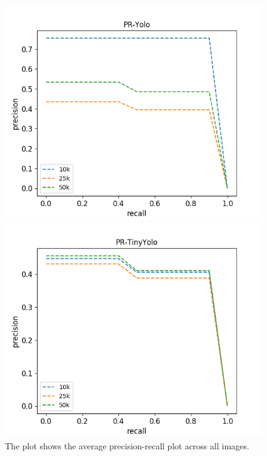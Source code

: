 \documentclass{article}
\begin{document}
\begin{figure}[h]
	\centering
	\begin{minipage}{0.45\textwidth}
		\centering
	\includegraphics[width=\textwidth]{fig/pr_yolo}
	\end{minipage}
	\begin{minipage}{0.45\textwidth}
		\centering
	\includegraphics[width=\textwidth]{fig/pr_tinyyolo}
	\end{minipage}
	\caption{The plot shows the average precision-recall plot across all images.}
	\label{fig:bb}
\end{figure}
\end{document}
